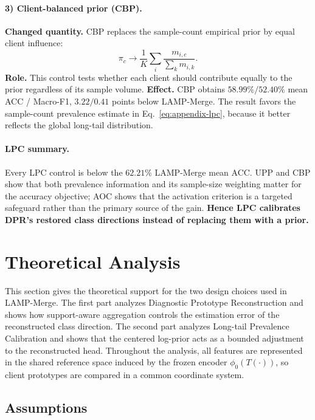 \documentclass[letterpaper]{article}
\theoremstyle{definition}
\theoremstyle{plain}
\begin{document}
\paragraph{3) Client-balanced prior (CBP).}
\textbf{Changed quantity.} CBP replaces the sample-count empirical prior by equal client influence:
\begin{equation}
\pi_c\longrightarrow\frac{1}{K}\sum_i\frac{m_{i,c}}{\sum_k m_{i,k}}.
\end{equation}
\textbf{Role.} This control tests whether each client should contribute equally to the prior regardless of its sample volume. \textbf{Effect.} CBP obtains \(58.99\% / 52.40\%\) mean ACC / Macro-F1, \(3.22 / 0.41\) points below LAMP-Merge. The result favors the sample-count prevalence estimate in Eq.~\ref{eq:appendix-lpc}, because it better reflects the global long-tail distribution.

\paragraph{LPC summary.} Every LPC control is below the \(62.21\%\) LAMP-Merge mean ACC. UPP and CBP show that both prevalence information and its sample-size weighting matter for the accuracy objective; AOC shows that the activation criterion is a targeted safeguard rather than the primary source of the gain. \textbf{Hence LPC calibrates DPR's restored class directions instead of replacing them with a prior.}

\section{Theoretical Analysis}
\label{app:theory}

This section gives the theoretical support for the two design choices used in LAMP-Merge. The first part analyzes Diagnostic Prototype Reconstruction and shows how support-aware aggregation controls the estimation error of the reconstructed class direction. The second part analyzes Long-tail Prevalence Calibration and shows that the centered log-prior acts as a bounded adjustment to the reconstructed head. Throughout the analysis, all features are represented in the shared reference space induced by the frozen encoder \(\phi_0(T(\cdot))\), so client prototypes are compared in a common coordinate system.

\subsection{Assumptions}
\end{document}
